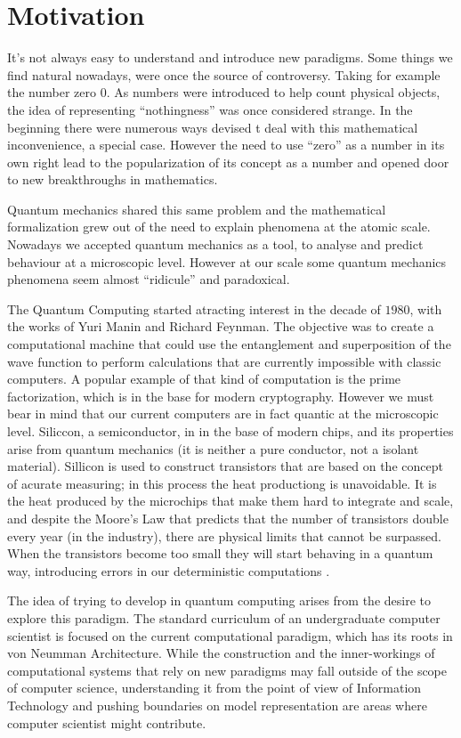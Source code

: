\section{Motivation}
\label{sec:int_motivation}



It's not always easy to understand and introduce new paradigms. Some things we find natural nowadays, were once the source of controversy. Taking for example the number zero $0$. As numbers were introduced to help count physical objects, the idea of representing ``nothingness'' was once considered strange. In the beginning there were numerous ways devised t deal with this mathematical inconvenience, a special case. However the need to use ``zero'' as a number in its own right lead to the popularization of its concept as a number and opened door to new breakthroughs in mathematics\cite{Kaplan2000}. 

Quantum mechanics shared this same problem and the mathematical formalization grew out of the need to explain phenomena at the atomic scale\cite{Mehra1982}. Nowadays we  accepted quantum mechanics as a tool, to analyse and predict behaviour at a microscopic level. However at our scale some quantum mechanics phenomena seem almost ``ridicule'' and paradoxical.

The Quantum Computing started atracting interest in the decade of $1980$, with the works of Yuri Manin and Richard Feynman. The objective was to create a computational machine that could use the entanglement and superposition of the wave function to perform calculations that are currently impossible with classic computers. A popular example of that kind of computation is the prime factorization, which is in the base for modern cryptography. 
However we must bear in mind that our current computers are in fact quantic at the microscopic level. 
Siliccon, a semiconductor, in in the base of modern chips, and its properties arise from quantum mechanics (it is neither a pure conductor, not a isolant material). Sillicon is used to construct transistors that are based on the concept of acurate measuring; in this process the heat productiong is unavoidable. It is the heat produced by the microchips that make them hard to integrate and scale, and despite the Moore's Law that predicts that the number of transistors double every year (in the industry), there are physical limits that cannot be surpassed. When the transistors become too small they will start behaving in a quantum way, introducing errors in our deterministic computations \cite{Laughlin2005}.

The idea of trying to develop in quantum computing arises from the desire to explore this paradigm. The standard curriculum of an undergraduate computer scientist is focused on the current computational paradigm, which has its roots in von Neumman Architecture\cite{neumann45edvac}. While the construction and the inner-workings of computational systems that rely on new paradigms may fall outside of the scope of computer science, understanding it from the point of view of Information Technology and pushing boundaries on model representation are areas where computer scientist might contribute.



